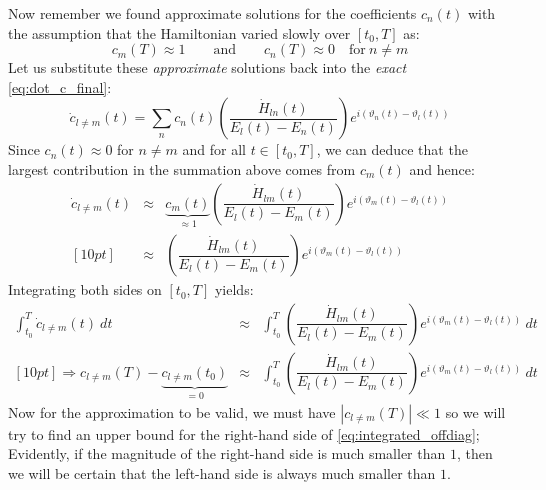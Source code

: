\documentclass[12pt,a4paper]{article}
\begin{document}
	Now remember we found approximate solutions for the coefficients $c_{n}(t)$ with the assumption that the Hamiltonian varied slowly over $\left[t_{0}, T\right]$ as:
	\begin{equation}
		c_{m}(T) \approx 1 \qquad \text{and}\qquad c_{n}(T) \approx 0 \quad \text{for}\ n \neq m
		\label{eq:approx_coeff}
	\end{equation}
	Let us substitute these \emph{approximate} solutions back into the \emph{exact} \eqref{eq:dot_c_final}:
	\begin{equation}
		\dot{c}_{l \neq m}(t) = \sum_{n} c_{n}(t) \left(\dfrac{\dot{H}_{ln}(t)}{E_{l}(t) - E_{n}(t)}\right) e^{i \left( \vartheta_{n}(t) - \vartheta_{l}(t) \right)}
		\label{eq:dot_c_offdiag}
	\end{equation}
	Since $c_{n}(t) \approx 0$ for $n \neq m$ and for all $t \in \left[t_{0}, T\right]$, we can deduce that the largest contribution in the summation above comes from $c_{m}(t)$ and hence:
	\begin{eqnarray}
		\dot{c}_{l \neq m}(t) &\approx& \underbrace{c_{m}(t)}_{\approx 1} \left(\dfrac{\dot{H}_{lm}(t)}{E_{l}(t) - E_{m}(t)}\right) e^{i \left( \vartheta_{m}(t) - \vartheta_{l}(t) \right)} \nonumber \\ [10pt]
		&\approx& \left(\dfrac{\dot{H}_{lm}(t)}{E_{l}(t) - E_{m}(t)}\right) e^{i \left( \vartheta_{m}(t) - \vartheta_{l}(t) \right)}
		\label{eq:dot_c_offdiag_approx}
	\end{eqnarray}
	Integrating both sides on $\left[t_{0}, T\right]$ yields:
	\begin{eqnarray}
		\int_{t_{0}}^{T} \dot{c}_{l \neq m}(t)\ dt &\approx& \int_{t_{0}}^{T} \left(\dfrac{\dot{H}_{lm}(t)}{E_{l}(t) - E_{m}(t)}\right) e^{i \left( \vartheta_{m}(t) - \vartheta_{l}(t) \right)}\ dt \\ [10pt]
		\Rightarrow c_{l \neq m}(T) - \underbrace{c_{l \neq m}(t_{0})}_{= 0} &\approx& \int_{t_{0}}^{T} \left(\dfrac{\dot{H}_{lm}(t)}{E_{l}(t) - E_{m}(t)}\right) e^{i \left( \vartheta_{m}(t) - \vartheta_{l}(t) \right)}\ dt
		\label{eq:integrated_offdiag}
	\end{eqnarray}
	Now for the approximation to be valid, we must have $\left| c_{l \neq m}(T) \right| \ll 1$ so we will try to find an upper bound for the right-hand side of \eqref{eq:integrated_offdiag}; Evidently, if the magnitude of the right-hand side is much smaller than $1$, then we will be certain that the left-hand side is always much smaller than $1$.
	
\end{document}
